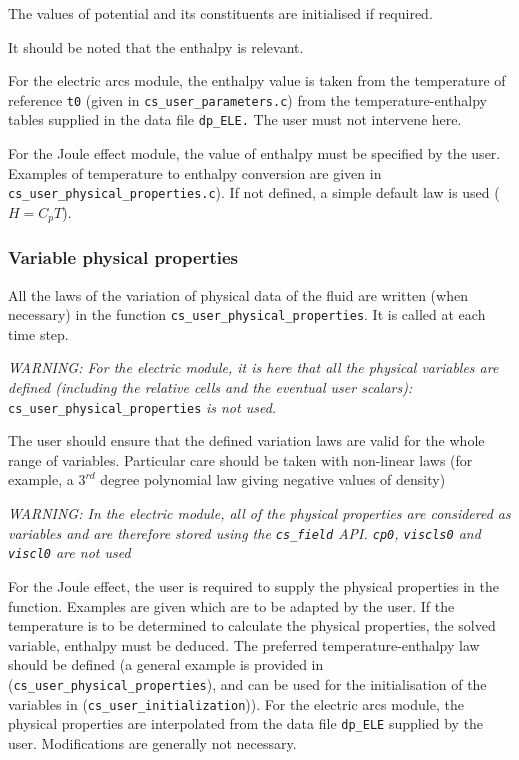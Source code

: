 The values of potential and its constituents are initialised if required.

It should be noted that the enthalpy is relevant.

\begin{list}{-}{}
\item For the electric arcs module, the enthalpy value is taken from the temperature
 of reference \texttt{t0} (given in \texttt{cs\_user\_parameters.c})
 from the temperature-enthalpy tables supplied in the data file \texttt{dp\_ELE.}
 The user must not intervene here.
\item For the Joule effect module, the value of enthalpy must be specified by the user.
 Examples of temperature to enthalpy conversion are given in
 \texttt{cs\_user\_physical\_properties.c}). If not defined, a simple default
 law is used ($H = C_p T$).
\end{list}

\subsubsection{Variable physical properties}

All the laws of the variation of physical data of the fluid are written (when necessary)
in the function \texttt{cs\_user\_physical\_properties}. It is called at each time step.

{\em WARNING: For the electric module, it is here that all the physical variables are defined
 (including the relative cells and the eventual user scalars):} \texttt{cs\_user\_physical\_properties} {\em {is not used.}}

The user should ensure that the defined variation laws are valid for the whole range of
variables. Particular care should be taken with non-linear laws (for example, a
 $3^{rd}$ degree polynomial law giving negative values of density)

{\em WARNING: In the electric module, all of the physical properties are considered as variables
 and are therefore stored using the \texttt{cs\_field} API. \texttt{cp0}, \texttt{viscls0} and \texttt{viscl0}
 are not used}

For the Joule effect, the user is required to supply the physical properties in the
function. Examples are given which are to be adapted by the user. If the temperature is
to be determined to calculate the physical properties, the solved variable, enthalpy must
 be deduced. The preferred temperature-enthalpy law should be defined
 (a general example is provided in (\texttt{cs\_user\_physical\_properties}),
 and can be used for the initialisation of the variables in
 (\texttt{cs\_user\_initialization})).
 For the electric arcs module, the physical properties are interpolated from the data file
 \texttt{dp\_ELE} supplied by the user. Modifications are generally not necessary.

